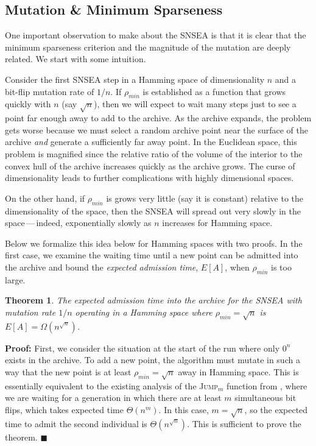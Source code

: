 \documentclass[twoside]{article}
\newtheorem{theorem}{Theorem}
\begin{document}
\subsection{Mutation \& Minimum Sparseness}
\label{subsec:mutation}
One important observation to make about the SNSEA is that it is clear that the minimum sparseness criterion and the magnitude of the mutation are deeply related.  We start with some intuition.

Consider the first SNSEA step in a Hamming space of dimensionality $n$ and a bit-flip mutation rate of $1/n$.  If $\rho_{min}$ is established as a function that grows quickly with $n$ (say $\sqrt{n}$), then we will expect to wait many steps just to see a point far enough away to add to the archive.  As the archive expands, the problem gets worse because we must select a random archive point near the surface of the archive \emph{and} generate a sufficiently far away point.  In the Euclidean space, this problem is magnified since the relative ratio of the volume of the interior to the convex hull of the archive increases quickly as the archive grows.  The curse of dimensionality leads to further complications with highly dimensional spaces.

On the other hand, if $\rho_{min}$ is grows very little (say it is constant) relative to the dimensionality of the space, then the SNSEA will spread out very slowly in the space\,---\,indeed, exponentially slowly as $n$ increases for Hamming space.  

Below we formalize this idea below for Hamming spaces with two proofs.  In the first case, we examine the waiting time until a new point can be admitted into the archive and bound the \emph{expected admission time}, $E[A]$, when $\rho_{min}$ is too large.  

\begin{theorem}
The expected admission time into the archive for the SNSEA with mutation rate $1/n$ operating in a Hamming space where $\rho_{min} = \sqrt{n}$ is $E[A] = \Omega(n^{\sqrt{n}})$.
\end{theorem}
\textbf{Proof:} First, we consider the situation at the start of the run where only $0^n$ exists in the archive.  To add a new point, the algorithm must mutate in such a way that the new point is at least $\rho_{min} = \sqrt{n}$ away in Hamming space.  This is essentially equivalent to the existing analysis of the \textsc{Jump}$_m$ function from \citep{Droste2003}, where we are waiting for a generation in which there are at least $m$ simultaneous bit flips, which takes expected time $\Theta(n^m)$.  In this case, $m = \sqrt{n}$, so the expected time to admit the second individual is $\Theta(n^{\sqrt{n}})$.  This is sufficient to prove the theorem. $\blacksquare$
\end{document}
